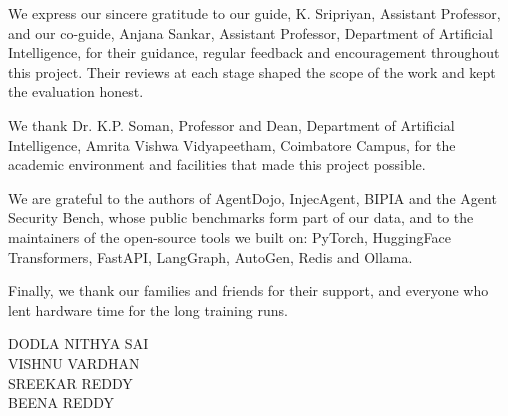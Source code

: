 We express our sincere gratitude to our guide, K. Sripriyan, Assistant Professor, and our co-guide, Anjana Sankar, Assistant Professor, Department of Artificial Intelligence, for their guidance, regular feedback and encouragement throughout this project. Their reviews at each stage shaped the scope of the work and kept the evaluation honest.

We thank Dr. K.P. Soman, Professor and Dean, Department of Artificial Intelligence, Amrita Vishwa Vidyapeetham, Coimbatore Campus, for the academic environment and facilities that made this project possible.

We are grateful to the authors of AgentDojo, InjecAgent, BIPIA and the Agent Security Bench, whose public benchmarks form part of our data, and to the maintainers of the open-source tools we built on: PyTorch, HuggingFace Transformers, FastAPI, LangGraph, AutoGen, Redis and Ollama.

Finally, we thank our families and friends for their support, and everyone who lent hardware time for the long training runs.

\vspace{1cm}
\begin{flushright}
DODLA NITHYA SAI\\VISHNU VARDHAN\\SREEKAR REDDY\\BEENA REDDY
\end{flushright}

